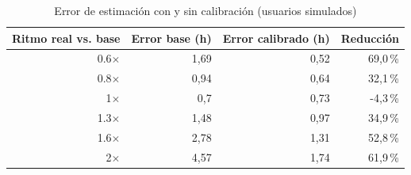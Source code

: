 \begin{table}[H]
\centering\small
\caption{Error de estimación con y sin calibración (usuarios simulados)}\label{tab:calibracion}
\begin{tabular}{rrrr}
\toprule
Ritmo real vs. base & Error base (h) & Error calibrado (h) & Reducción \\
\midrule
0.6$\times$ & 1,69 & 0,52 & 69,0\,\% \\
0.8$\times$ & 0,94 & 0,64 & 32,1\,\% \\
1$\times$ & 0,7 & 0,73 & -4,3\,\% \\
1.3$\times$ & 1,48 & 0,97 & 34,9\,\% \\
1.6$\times$ & 2,78 & 1,31 & 52,8\,\% \\
2$\times$ & 4,57 & 1,74 & 61,9\,\% \\
\bottomrule
\end{tabular}
\end{table}
